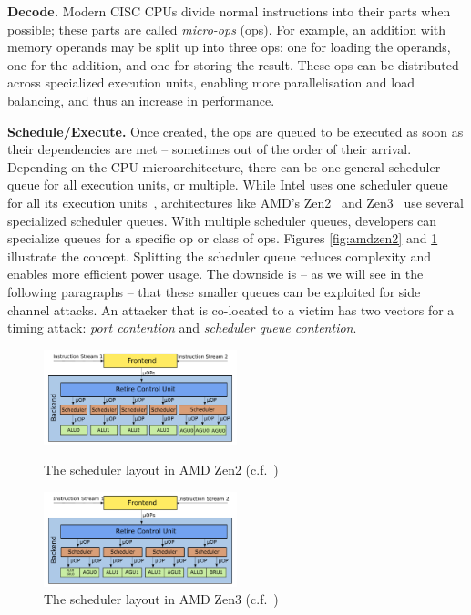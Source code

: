 \documentclass[11pt,
  titlepage=false,
]{scrreprt}
\begin{document}
\textbf{Decode.}
Modern CISC CPUs divide normal instructions into their parts when possible;
these parts are called \textit{micro-ops} (\textmu ops)\cite{AMD2020OptimizationEPYC7002}.
For example, an addition with memory operands may be split up into three \textmu ops: one for loading the operands, one for the addition, and one for storing the result.
These \textmu ops can be distributed across specialized execution units, enabling more parallelisation and load balancing, and thus an increase in performance.

\textbf{Schedule/Execute.}
Once created, the \textmu ops are queued to be executed as soon as their dependencies are met -- sometimes out of the order of their arrival.
Depending on the CPU microarchitecture, there can be one general scheduler queue for all execution units, or multiple.
While Intel uses one scheduler queue for all its execution units~\cite{Intel_opt},
architectures like AMD's Zen2~\cite{AMD2020OptimizationEPYC7002} and Zen3~\cite{AMD2020OptimizationEPYC7003} use several specialized scheduler queues.
With multiple scheduler queues, developers can specialize queues for a specific \textmu op or class of \textmu ops.
Figures \ref{fig:amdzen2} and \ref{fig:amdzen3} illustrate the concept.
Splitting the scheduler queue reduces complexity and enables more efficient power usage.
The downside is -- as we will see in the following paragraphs -- that these smaller queues can be exploited for side channel attacks.
An attacker that is co-located to a victim has two vectors for a timing attack: \textit{port contention} and \textit{scheduler queue contention}.

\begin{figure}
    \centering
    \includegraphics[width=0.5\textwidth]{figures/Zen2 arch}

    \caption{The scheduler layout in AMD Zen2 (c.f.~\cite{AMD2020OptimizationEPYC7002})}
    \label{fig:amdzen2}

    \includegraphics[width=0.5\textwidth]{figures/Zen3 arch}

    \caption{The scheduler layout in AMD Zen3 (c.f.~\cite{AMD2020OptimizationEPYC7003})}
    \label{fig:amdzen3}
\end{figure}
\end{document}
